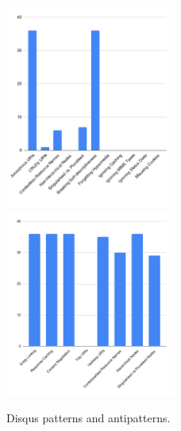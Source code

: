\begin{figure}[htb!]

\includegraphics[width=0.5\textwidth]{img/barchart/disqusBarAnti.pdf}
\includegraphics[width=0.5\textwidth]{img/barchart/disqusBarPatt.pdf}
\caption{Disqus patterns and antipatterns.}
\label{fig:disqusBarPatt}

\end{figure}

